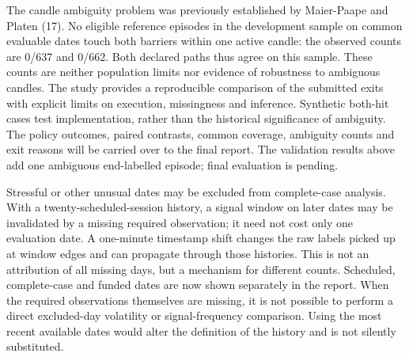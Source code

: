 \documentclass[11pt,a4paper]{article}
\begin{document}
The candle ambiguity problem was previously established by Maier-Paape and Platen (17). No eligible reference episodes in the development sample on common evaluable dates touch both barriers within one active candle: the observed counts are 0/637 and 0/662. Both declared paths thus agree on this sample. These counts are neither population limits nor evidence of robustness to ambiguous candles. The study provides a reproducible comparison of the submitted exits with explicit limits on execution, missingness and inference. Synthetic both-hit cases test implementation, rather than the historical significance of ambiguity. The policy outcomes, paired contrasts, common coverage, ambiguity counts and exit reasons will be carried over to the final report. The validation results above add one ambiguous end-labelled episode; final evaluation is pending.

Stressful or other unusual dates may be excluded from complete-case analysis. With a twenty-scheduled-session history, a signal window on later dates may be invalidated by a missing required observation; it need not cost only one evaluation date. A one-minute timestamp shift changes the raw labels picked up at window edges and can propagate through those histories. This is not an attribution of all missing days, but a mechanism for different counts. Scheduled, complete-case and funded dates are now shown separately in the report. When the required observations themselves are missing, it is not possible to perform a direct excluded-day volatility or signal-frequency comparison. Using the most recent available dates would alter the definition of the history and is not silently substituted.
\end{document}
